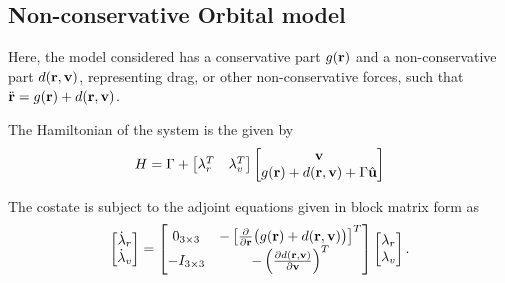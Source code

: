 


\subsection{Non-conservative Orbital model}

Here, the model considered has a conservative part \(g(\mathbf{r})\) and a non-conservative part \(d(\mathbf{r}, \mathbf{v})\), representing drag, or other non-conservative forces, such that \(\ddot{\mathbf{r}} = g(\mathbf{r}) + d(\mathbf{r}, \mathbf{v})\).

The Hamiltonian of the system is the given by
\begin{equation}
    H = \Gamma + \begin{bmatrix}
        \mathbf{\lambda}_r^T & \mathbf{\lambda}_v^T
    \end{bmatrix} \begin{bmatrix}
        \mathbf{v} \\ g(\mathbf{r}) + d(\mathbf{r}, \mathbf{v}) + \Gamma \hat{\mathbf{u}}
    \end{bmatrix}
\end{equation}

The costate is subject to the adjoint equations given in block matrix form as
\begin{equation}\label{eq:lambda_dot_ncon}
    \begin{bmatrix}
        \dot{\mathbf{\lambda}}_r \\ \dot{\mathbf{\lambda}}_v
    \end{bmatrix} = \begin{bmatrix}
        0_{3\times3} & -\left[\frac{\partial }{\partial \mathbf{r}}\big(g(\mathbf{r}) + d(\pos, \vel)\big)\right]^T \\
        -I_{3\times3} & -\left(\frac{\partial d(\pos, \vel)}{\partial \vel}\right)^T 
    \end{bmatrix} \begin{bmatrix}
        \mathbf{\lambda}_r \\ \mathbf{\lambda}_v
    \end{bmatrix}.
\end{equation}

